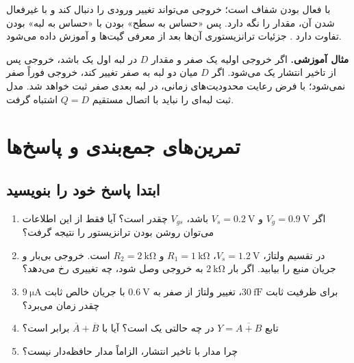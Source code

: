  با فعال بودن  شفاف است؛ خروجی می‌تواند تغییر ورودی را
دنبال کند و با غیرفعال شدن آن، مقدار را نگه دارد.
پس «حساس به سطح» بودن  با «حساس به لبه» بودن  تفاوت دارد
\cite[بخش ]{weste}.
جزئیات ترانزیستوری آن‌ها بعد از معرفی گیت‌ها و  آموزش داده می‌شود.

\textbf{مثال آموزشی.} اگر خروجی اولیه یک  صفر و مقدار
\(D\) در لبه اول یک باشد، خروجی پس از تاخیر انتشار یک می‌شود.
اگر \(D\) میان دو لبه به صفر تغییر کند، خروجی فوراً صفر نمی‌شود؛
با فرض رعایت محدودیت‌های زمانی، در لبه بعدی صفر ثبت خواهد شد.
مدل ثبت لبه‌ای را نباید با اتصال مستقیم \(Q=D\) اشتباه گرفت.

\section{تمرین‌های جمع‌بندی و پاسخ‌ها}
\subsection{ابتدا پاسخ خود را بنویسید}
\begin{enumerate}
\item اگر \(V_g=\qty{0.9}{\volt}\) و \(V_s=\qty{0.2}{\volt}\) باشد،
\(V_{gs}\) چقدر است؟ آیا فقط از این اطلاعات می‌توان روشن بودن ترانزیستور را نتیجه گرفت؟
\item در تقسیم ولتاژ، \(V_s=\qty{1.2}{\volt}\)، \(R_1=\qty{1}{\kilo\ohm}\)
و \(R_2=\qty{2}{\kilo\ohm}\) است. خروجی بی‌بار و جریان منبع را بیابید.
اگر بار \(\qty{2}{\kilo\ohm}\) به خروجی وصل شود، چه تغییری رخ می‌دهد؟
\item برای ظرفیت ثابت \(\qty{30}{\femto\farad}\)، تغییر ولتاژ از صفر به
\(\qty{0.6}{\volt}\) با جریان خالص ثابت \(\qty{9}{\micro\ampere}\) چقدر زمان می‌برد؟
\item تابع \(Y=\overline{A+B}\) در چه حالتی یک است؟ آیا با \(\overline{A}+\overline{B}\) برابر است؟
\item چرا مدار با تاخیر انتشار، الزاماً مدار حافظه‌دار نیست؟
\end{enumerate}

